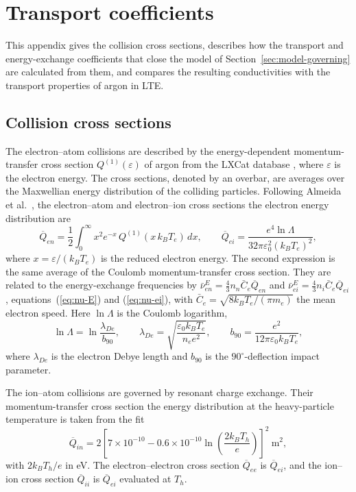 \section{Transport coefficients}
\label{app:transport}

This appendix gives the collision cross sections, describes how the transport and energy-exchange coefficients that close the model of Section~\ref{sec:model-governing} are calculated from them, and compares the resulting conductivities with the transport properties of argon in LTE.


\subsection{Collision cross sections}
\label{app:cross}
The electron--atom collisions are described by the energy-dependent momentum-transfer cross section \(Q^{(1)}(\varepsilon)\) of argon from the LXCat database \cite{lxcat}, where \(\varepsilon\) is the electron energy. The  cross sections, denoted by an overbar, are averages over the Maxwellian energy distribution of the colliding particles. Following Almeida et al.\ \cite{Almeida2008}, the  electron--atom and electron--ion  cross sections  the electron energy distribution are
\begin{equation}
\overline{Q}_{en}=\frac12\int_0^\infty x^2e^{-x}\,Q^{(1)}(x\,k_BT_e)\,dx,\qquad
\overline{Q}_{ei}=\frac{e^4\ln\Lambda}{32\pi\varepsilon_0^2(k_BT_e)^2},
\label{eq:Qbar-e}
\end{equation}
where \(x=\varepsilon/(k_BT_e)\) is the reduced electron energy. The second expression is the same average of the Coulomb momentum-transfer cross section. They are related to the energy-exchange frequencies by \(\bar\nu^E_{en}=\tfrac43n_n\bar C_e\overline{Q}_{en}\) and \(\bar\nu^E_{ei}=\tfrac43n_i\bar C_e\overline{Q}_{ei}\), equations~(\ref{eq:nu-E}) and (\ref{eq:nu-ei}), with \(\bar C_e=\sqrt{8k_BT_e/(\pi m_e)}\) the mean electron speed. Here \(\ln\Lambda\) is the Coulomb logarithm,
\begin{equation}
\ln\Lambda=\ln\frac{\lambda_{De}}{b_{90}},\qquad
\lambda_{De}=\sqrt{\frac{\varepsilon_0k_BT_e}{n_ee^2}},\qquad
b_{90}=\frac{e^2}{12\pi\varepsilon_0k_BT_e} ,
\label{eq:coulomb-log}
\end{equation}
where \(\lambda_{De}\) is the electron Debye length and \(b_{90}\) is the \(90^\circ\)-deflection impact parameter. 

The ion--atom collisions are governed by resonant charge exchange. Their  momentum-transfer cross section  the energy distribution at the heavy-particle temperature is taken from the fit \cite{benilov1998ionization}
\begin{equation}
\overline{Q}_{in}=2\left[7\times10^{-10}-0.6\times10^{-10}\ln\left(\frac{2k_BT_h}{e}\right)\right]^2\ \mathrm{m^2},
\label{eq:Qia}
\end{equation}
with \(2k_BT_h/e\) in eV. The  electron--electron cross section \(\overline{Q}_{ee}\) is \(\overline{Q}_{ei}\), and the  ion--ion cross section \(\overline{Q}_{ii}\) is \(\overline{Q}_{ei}\) evaluated at \(T_h\).

